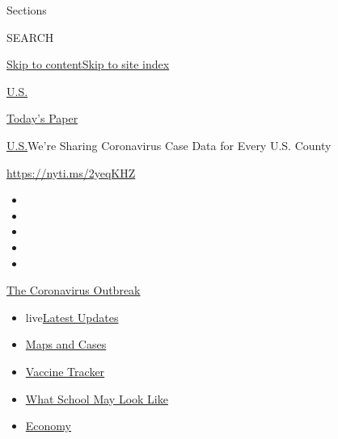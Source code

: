 Sections

SEARCH

\protect\hyperlink{site-content}{Skip to
content}\protect\hyperlink{site-index}{Skip to site index}

\href{https://www.nytimes.com/section/us}{U.S.}

\href{https://myaccount.nytimes.com/auth/login?response_type=cookie\&client_id=vi}{}

\href{https://www.nytimes.com/section/todayspaper}{Today's Paper}

\href{/section/us}{U.S.}\textbar{}We're Sharing Coronavirus Case Data
for Every U.S. County

\url{https://nyti.ms/2yeqKHZ}

\begin{itemize}
\item
\item
\item
\item
\item
\end{itemize}

\href{https://www.nytimes.com/news-event/coronavirus?action=click\&pgtype=Article\&state=default\&region=TOP_BANNER\&context=storylines_menu}{The
Coronavirus Outbreak}

\begin{itemize}
\tightlist
\item
  live\href{https://www.nytimes.com/2020/08/02/world/coronavirus-updates.html?action=click\&pgtype=Article\&state=default\&region=TOP_BANNER\&context=storylines_menu}{Latest
  Updates}
\item
  \href{https://www.nytimes.com/interactive/2020/us/coronavirus-us-cases.html?action=click\&pgtype=Article\&state=default\&region=TOP_BANNER\&context=storylines_menu}{Maps
  and Cases}
\item
  \href{https://www.nytimes.com/interactive/2020/science/coronavirus-vaccine-tracker.html?action=click\&pgtype=Article\&state=default\&region=TOP_BANNER\&context=storylines_menu}{Vaccine
  Tracker}
\item
  \href{https://www.nytimes.com/interactive/2020/07/29/us/schools-reopening-coronavirus.html?action=click\&pgtype=Article\&state=default\&region=TOP_BANNER\&context=storylines_menu}{What
  School May Look Like}
\item
  \href{https://www.nytimes.com/live/2020/07/31/business/stock-market-today-coronavirus?action=click\&pgtype=Article\&state=default\&region=TOP_BANNER\&context=storylines_menu}{Economy}
\end{itemize}

